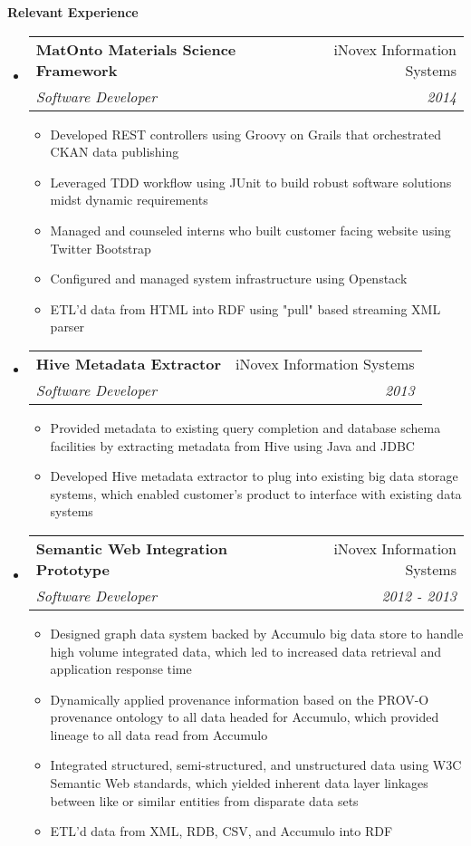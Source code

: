 \documentclass[letterpaper,11pt]{article}
\makeatletter
\newcommand{\resitem}[1]{\item #1 \vspace{-2pt}}
\newcommand{\resheading}[1]{{\large \colorbox{mygrey}{\begin{minipage}{\textwidth}{\textbf{#1 \vphantom{p\^{E}}}}\end{minipage}}}}
\newcommand{\ressubheading}[4]{
\begin{tabular*}{7.0in}{l@{\extracolsep{\fill}}r}
		\textbf{#1} & #2 \\
		\textit{#3} & \textit{#4} \\
\end{tabular*}\vspace{-6pt}}
\makeatother
\begin{document}
\resheading{Relevant Experience}
\begin{itemize}
	\item
	\ressubheading{MatOnto Materials Science Framework}{iNovex Information Systems}{Software Developer}{2014}
	\begin{itemize}
		\resitem{Developed REST controllers using Groovy on Grails that orchestrated CKAN data publishing}
		\resitem{Leveraged TDD workflow using JUnit to build robust software solutions midst dynamic requirements}
		\resitem{Managed and counseled interns who built customer facing website using Twitter Bootstrap}
		\resitem{Configured and managed system infrastructure using Openstack}
		\resitem{ETL'd data from HTML into RDF using "pull" based streaming XML parser}
	\end{itemize}

	\item
	\ressubheading{Hive Metadata Extractor}{iNovex Information Systems}{Software Developer}{2013}
	\begin{itemize}
		\resitem{Provided metadata to existing query completion and database schema facilities by extracting metadata from Hive using Java and JDBC}
		\resitem{Developed Hive metadata extractor to plug into existing big data storage systems, which enabled customer's product to interface with existing data systems}
	\end{itemize}
	
	\item
	\ressubheading{Semantic Web Integration Prototype}{iNovex Information Systems}{Software Developer}{2012 - 2013}
	\begin{itemize}
		\resitem{Designed graph data system backed by Accumulo big data store to handle high volume integrated data, which led to increased data retrieval and application response time}
		\resitem{Dynamically applied provenance information based on the PROV-O provenance ontology to all data headed for Accumulo, which provided lineage to all data read from Accumulo}
		\resitem{Integrated structured, semi-structured, and unstructured data using W3C Semantic Web standards, which yielded inherent data layer linkages between like or similar entities from disparate data sets}
		\resitem{ETL'd data from XML, RDB, CSV, and Accumulo into RDF}
	\end{itemize}
	
\end{itemize}
\end{document}
